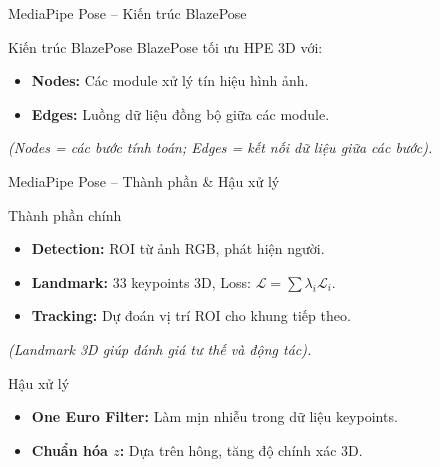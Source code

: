 \begin{frame}{MediaPipe Pose – Kiến trúc BlazePose}
    \begin{block}{Kiến trúc BlazePose}
        BlazePose tối ưu HPE 3D với:
        \begin{itemize}
            \item \textbf{Nodes:} Các module xử lý tín hiệu hình ảnh.
            \item \textbf{Edges:} Luồng dữ liệu đồng bộ giữa các module.
        \end{itemize}
        \small{\textit{(Nodes = các bước tính toán; Edges = kết nối dữ liệu giữa các bước).}}
    \end{block}
\end{frame}

\begin{frame}{MediaPipe Pose – Thành phần & Hậu xử lý}
    \begin{exampleblock}{Thành phần chính}
        \begin{itemize}
            \item \textbf{Detection:} ROI từ ảnh RGB, phát hiện người.
            \item \textbf{Landmark:} 33 keypoints 3D, Loss: $\mathcal{L} = \sum \lambda_i \mathcal{L}_i$.
            \item \textbf{Tracking:} Dự đoán vị trí ROI cho khung tiếp theo.
        \end{itemize}
        \small{\textit{(Landmark 3D giúp đánh giá tư thế và động tác).}}
    \end{exampleblock}

    \begin{alertblock}{Hậu xử lý}
        \begin{itemize}
            \item \textbf{One Euro Filter:} Làm mịn nhiễu trong dữ liệu keypoints.
            \item \textbf{Chuẩn hóa $z$:} Dựa trên hông, tăng độ chính xác 3D.
        \end{itemize}
    \end{alertblock}
\end{frame}

